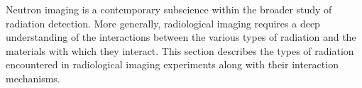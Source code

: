 \documentclass[../../../main.tex]{subfiles}
\begin{document}
%
    \Xsubsection%
    Neutron imaging is a contemporary subscience within the broader study of radiation detection.
    More generally, radiological imaging requires a deep understanding of the interactions between the various types of radiation and the materials with which they interact.
    This section describes the types of radiation encountered in radiological imaging experiments along with their interaction mechanisms. 
\end{document}
